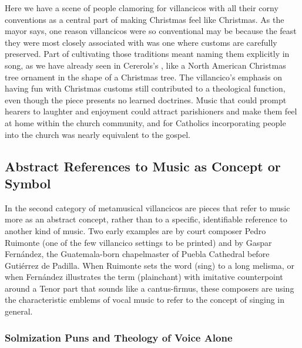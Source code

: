 Here we have a scene of people clamoring for villancicos with all their corny
conventions as a central part of making Christmas feel like Christmas.
As the mayor says, one reason villancicos were so conventional may be because
the feast they were most closely associated with was one where customs are
carefully preserved.
Part of cultivating those traditions meant naming them explicitly in song, as we
have already seen in Cererols's , like a
North American Christmas tree ornament in the shape of a Christmas tree.
The villancico's emphasis on having fun with Christmas customs still
contributed to a theological function, even though the piece presents no
learned doctrines.%
    \Autocite[161--185]{Illari:Polychoral}
Music that could prompt hearers to laughter and enjoyment could attract
parishioners and make them feel at home within the church community, and for
Catholics incorporating people into the church was nearly equivalent to the
gospel.

\subsection{Abstract References to Music as Concept or Symbol}

In the second category of metamusical villancicos are pieces that refer to
music more as an abstract concept, rather than to a specific, identifiable
reference to another kind of music.
Two early examples are  by court composer Pedro
Ruimonte (one of the few villancico settings to be printed) and  by Gaspar Fernández, the Guatemala-born chapelmaster of
Puebla Cathedral before Gutiérrez de Padilla.%
    \Autocites
    {Ruimonte:Parnaso}
    {Fernandez:Cancionero}
    [for crucial emendations to the latter composer's biography, see][]
    {Morales:Fernandez}
When Ruimonte sets the word  (sing) to a long melisma, or when
Fernández illustrates the term  (plainchant) with
imitative counterpoint around a Tenor part that sounds like a cantus-firmus,
these composers are using the characteristic emblems of vocal music to refer to
the concept of singing in general.%

\subsubsection{Solmization Puns and Theology of Voice Alone}

